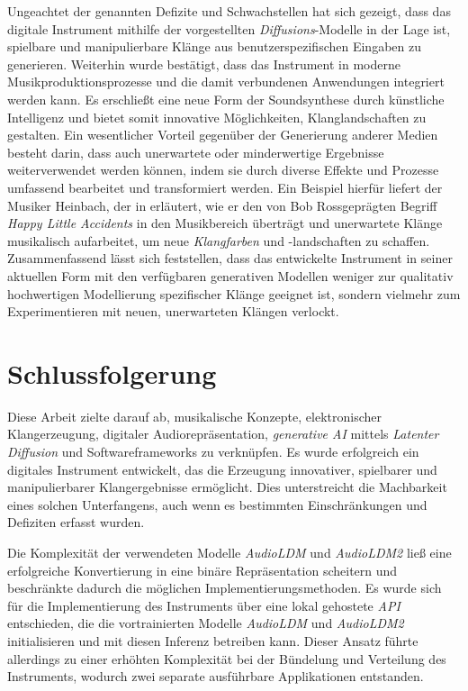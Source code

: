 \documentclass[
  a4paper,  %
  twoside,  %
  bibliography=totoc,
  headsepline,
  cleardoublepage=empty,
  parskip=half,
  draft=false
]{scrbook}
\begin{document}
{Ungeachtet der genannten Defizite und Schwachstellen hat sich gezeigt, dass das digitale Instrument mithilfe der vorgestellten \emph{Diffusions}-Modelle in der Lage ist, spielbare und manipulierbare Klänge aus benutzerspezifischen Eingaben zu generieren. Weiterhin wurde bestätigt, dass das Instrument in moderne Musikproduktionsprozesse und die damit verbundenen Anwendungen integriert werden kann. Es erschließt eine neue Form der Soundsynthese durch künstliche Intelligenz und bietet somit innovative Möglichkeiten, Klanglandschaften zu gestalten. Ein wesentlicher Vorteil gegenüber der Generierung anderer Medien besteht darin, dass auch unerwartete oder minderwertige Ergebnisse weiterverwendet werden können, indem sie durch diverse Effekte und Prozesse umfassend bearbeitet und transformiert werden. Ein Beispiel hierfür liefert der Musiker \glqq Heinbach\grqq, der in \cite{hainbach_how_2021} erläutert, wie er den von \glqq Bob Ross\grqq geprägten Begriff \emph{Happy Little Accidents} in den Musikbereich überträgt und unerwartete Klänge musikalisch aufarbeitet, um neue \emph{Klangfarben} und -landschaften zu schaffen. Zusammenfassend lässt sich feststellen, dass das entwickelte Instrument in seiner aktuellen Form mit den verfügbaren generativen Modellen weniger zur qualitativ hochwertigen Modellierung spezifischer Klänge geeignet ist, sondern vielmehr zum Experimentieren mit neuen, unerwarteten Klängen verlockt.

\chapter{Schlussfolgerung}
Diese Arbeit zielte darauf ab, musikalische Konzepte, elektronischer Klangerzeugung, digitaler Audiorepräsentation, \emph{generative AI} mittels \emph{Latenter Diffusion} und Softwareframeworks zu verknüpfen. Es wurde erfolgreich ein digitales Instrument entwickelt, das die Erzeugung innovativer, spielbarer und manipulierbarer Klangergebnisse ermöglicht. Dies unterstreicht die Machbarkeit eines solchen Unterfangens, auch wenn es bestimmten Einschränkungen und Defiziten erfasst wurden.

Die Komplexität der verwendeten Modelle \emph{AudioLDM} \cite{liu_audioldm_2023} und \emph{AudioLDM2} \cite{liu_audioldm2_2023} ließ eine erfolgreiche Konvertierung in eine binäre Repräsentation scheitern und beschränkte dadurch die möglichen Implementierungsmethoden. Es wurde sich für die Implementierung des Instruments über eine lokal gehostete \emph{API} entschieden, die die vortrainierten Modelle \emph{AudioLDM} und \emph{AudioLDM2} initialisieren und mit diesen Inferenz betreiben kann. Dieser Ansatz führte allerdings zu einer erhöhten Komplexität bei der Bündelung und Verteilung des Instruments, wodurch zwei separate ausführbare Applikationen entstanden.

}
\end{document}
